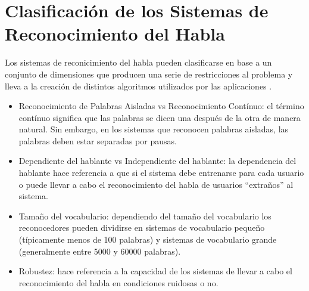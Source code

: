 \section{Clasificaci\'on de los Sistemas de Reconocimiento del Habla}

Los sistemas de reconicimiento del habla pueden clasificarse en base a un conjunto de dimensiones
que producen una serie de restricciones al problema y lleva a la creaci\'on de distintos algoritmos
utilizados por las aplicaciones \cite{Jurafsky}.

\begin{itemize}
    \item Reconocimiento de Palabras Aisladas vs Reconocimiento Cont\'inuo: el t\'ermino cont\'inuo significa
        que las palabras se dicen una despu\'es de la otra de manera natural. Sin embargo, en los sistemas
        que reconocen palabras aisladas, las palabras deben estar separadas por pausas.
    \item Dependiente del hablante vs Independiente del hablante: la dependencia del hablante hace referencia
        a que si el sistema debe entrenarse para cada usuario o puede llevar a cabo el reconocimiento del habla
        de usuarios ``extra\~nos'' al sistema.
    \item Tama\~no del vocabulario: dependiendo del tama\~no del vocabulario los reconocedores pueden dividirse
        en sistemas de vocabulario peque\~no (t\'ipicamente menos de 100 palabras) y sistemas de vocabulario grande (generalmente
        entre 5000 y 60000 palabras).
    \item Robustez: hace referencia a la capacidad de los sistemas de llevar a cabo el 
        reconocimiento del habla en condiciones ruidosas o no.
\end{itemize}